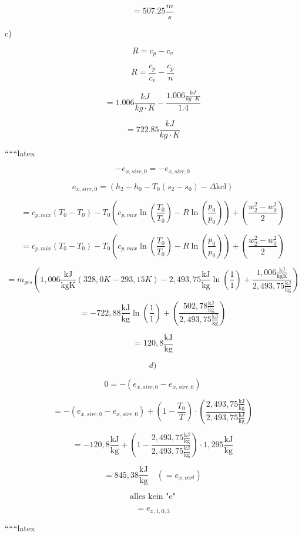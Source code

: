 \[
= 507.25 \frac{m}{s}
\]

c)

\[
R = c_{p} - c_{v}
\]

\[
R = \frac{c_{p}}{c_{v}} - \frac{c_{p}}{n}
\]

\[
= 1.006 \frac{kJ}{kg \cdot K} - \frac{1.006 \frac{kJ}{kg \cdot K}}{1.4}
\]

\[
= 722.85 \frac{kJ}{kg \cdot K}
\]

``````latex


\[
-e_{x,sirr,0} = -e_{x,sirr,0}
\]

\[
e_{x,sirr,0} = (h_2 - h_0 - T_0 (s_2 - s_0) - \Delta \text{kcl})
\]

\[
= c_{p,mix} (T_0 - T_0) - T_0 \left( c_{p,mix} \ln \left( \frac{T_0}{T_0} \right) - R \ln \left( \frac{p_0}{p_0} \right) \right) + \left( \frac{w_2^2 - w_0^2}{2} \right)
\]

\[
= c_{p,mix} (T_0 - T_0) - T_0 \left( c_{p,mix} \ln \left( \frac{T_0}{T_0} \right) - R \ln \left( \frac{p_0}{p_0} \right) \right) + \left( \frac{w_2^2 - w_0^2}{2} \right)
\]

\[
= \dot{m}_{ges} \left( 1,006 \frac{\text{kJ}}{\text{kgK}} (328,0 K - 293,15 K) - 2,493,75 \frac{\text{kJ}}{\text{kg}} \ln \left( \frac{1}{1} \right) + \frac{1,006 \frac{\text{kJ}}{\text{kgK}}}{2,493,75 \frac{\text{kJ}}{\text{kg}}} \right)
\]

\[
= -722,88 \frac{\text{kJ}}{\text{kg}} \ln \left( \frac{1}{1} \right) + \left( \frac{502,78 \frac{\text{kJ}}{\text{kg}}}{2,493,75 \frac{\text{kJ}}{\text{kg}}} \right)
\]

\[
= 120,8 \frac{\text{kJ}}{\text{kg}}
\]

\[
d)
\]

\[
0 = - (e_{x,sirr,0} - e_{x,sirr,0})
\]

\[
= - (e_{x,sirr,0} - e_{x,sirr,0}) + \left( 1 - \frac{T_0}{T} \right) \cdot \left( \frac{2,493,75 \frac{\text{kJ}}{\text{kg}}}{2,493,75 \frac{\text{kJ}}{\text{kg}}} \right)
\]

\[
= -120,8 \frac{\text{kJ}}{\text{kg}} + \left( 1 - \frac{2,493,75 \frac{\text{kJ}}{\text{kg}}}{2,493,75 \frac{\text{kJ}}{\text{kg}}} \right) \cdot 1,295 \frac{\text{kJ}}{\text{kg}}
\]

\[
= 845,38 \frac{\text{kJ}}{\text{kg}} \quad (= e_{x,verl})
\]

\[
\text{alles kein "e"}
\]

\[
= e_{x,1,0,3}
\]

``````latex


